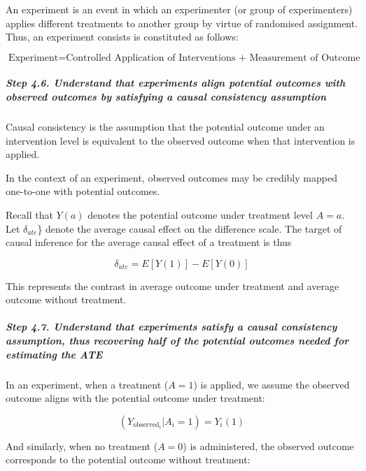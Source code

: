 \documentclass[
  singlecolumn]{article}
\let\oldsubparagraph\subparagraph
\renewcommand{\subparagraph}[1]{\oldsubparagraph{#1}\mbox{}}
\begin{document}
An experiment is an event in which an experimenter (or group of
experimenters) applies different treatments to another group by virtue
of randomised assignment. Thus, an experiment consists is constituted as
follows:

\[
\text{Experiment} = \text{Controlled Application of Interventions + Measurement of Outcome}
\]

\subparagraph{\texorpdfstring{\textbf{Step 4.6. Understand that
experiments align potential outcomes with observed outcomes by
satisfying a causal consistency
assumption}}{Step 4.6. Understand that experiments align potential outcomes with observed outcomes by satisfying a causal consistency assumption}}\label{step-4.6.-understand-that-experiments-align-potential-outcomes-with-observed-outcomes-by-satisfying-a-causal-consistency-assumption}

Causal consistency is the assumption that the potential outcome under an
intervention level is equivalent to the observed outcome when that
intervention is applied.

In the context of an experiment, observed outcomes may be credibly
mapped one-to-one with potential outcomes.

Recall that \(Y(a)\) denotes the potential outcome under treatment level
\(A = a\). Let \(\delta_{ate}\)\} denote the average causal effect on
the difference scale. The target of causal inference for the average
causal effect of a treatment is thus

\[
\delta_{ate} = E[Y(1)] - E[Y(0)]
\]

This represents the contrast in average outcome under treatment and
average outcome without treatment.

\subparagraph{\texorpdfstring{\textbf{Step 4.7. Understand that
experiments satisfy a causal consistency assumption, thus recovering
half of the potential outcomes needed for estimating the
ATE}}{Step 4.7. Understand that experiments satisfy a causal consistency assumption, thus recovering half of the potential outcomes needed for estimating the ATE}}\label{step-4.7.-understand-that-experiments-satisfy-a-causal-consistency-assumption-thus-recovering-half-of-the-potential-outcomes-needed-for-estimating-the-ate}

In an experiment, when a treatment (\(A = 1\)) is applied, we assume the
observed outcome aligns with the potential outcome under treatment:

\[
(Y_{\text{observed}_i}|A_i = 1) = Y_i(1)
\]

And similarly, when no treatment (\(A = 0\)) is administered, the
observed outcome corresponds to the potential outcome without treatment:
\end{document}
